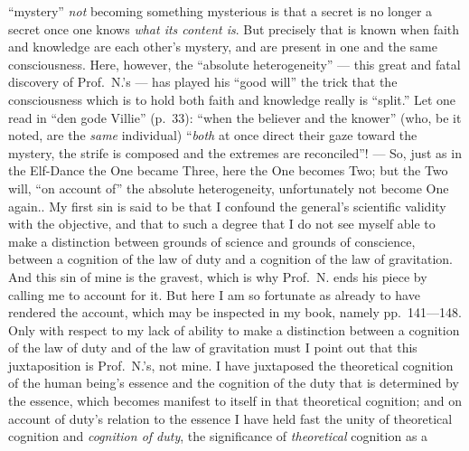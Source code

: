 \documentclass[12pt,a4paper]{book}
\begin{document}
{  ``mystery'' \emph{not} becoming something mysterious is that a secret is no
  longer a secret once one knows \emph{what its content is}. But precisely that
  is known when faith and knowledge are each other's mystery, and are present
  in one and the same consciousness. Here, however, the ``absolute
  heterogeneity'' --- this great and fatal discovery of Prof.\ N.'s --- has
  played his ``good will'' the trick that the consciousness which is to hold
  both faith and knowledge really is ``split.'' Let one read in ``den gode
  Villie'' (p.\ 33): ``when the believer and the knower'' (who, be it noted,
  are the \emph{same} individual) ``\emph{both} at once direct their gaze
  toward the mystery, the strife is composed and the extremes are reconciled''!
  --- So, just as in the Elf-Dance the One became Three, here the One becomes
  Two; but the Two will, ``on account of'' the absolute heterogeneity,
  unfortunately not become One again.}.
My first sin is said to be that I confound the general's scientific
validity with the objective, and that to such a degree that I do not see myself
able to make a distinction between grounds of science and grounds of
conscience, between a cognition of the law of duty and a cognition of the law
of gravitation. And this sin of mine is the gravest, which is why Prof.\ N.
ends his piece by calling me to account for it. But here I am so fortunate as
already to have rendered the account, which may be inspected in my book,
namely pp.\ 141---148. Only with respect to my lack of ability to make a
distinction between a cognition of the law of duty and of the law of
gravitation must I point out that this juxtaposition is Prof.\ N.'s, not mine.
I have juxtaposed the theoretical cognition of the human being's essence and
the cognition of the duty that is determined by the essence, which becomes
manifest to itself in that theoretical cognition; and on account of duty's
relation to the essence I have held fast the unity of theoretical cognition and
\emph{cognition of duty}, the significance of \emph{theoretical} cognition as a
\end{document}
